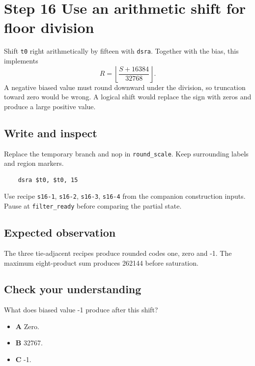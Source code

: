 \section{Step 16 Use an arithmetic shift for floor division}\label{fir-s16}

Shift \texttt{t0} right arithmetically by fifteen with \texttt{dsra}. Together with the bias, this implements
\[R=\left\lfloor\frac{S+16384}{32768}\right\rfloor.\]
A negative biased value must round downward under the division, so truncation toward zero would be wrong. A logical shift would replace the sign with zeros and produce a large positive value.

\subsection{Write and inspect}
Replace the temporary branch and nop in \texttt{round\_scale}. Keep surrounding labels and region markers.

\begin{verbatim}
    dsra $t0, $t0, 15
\end{verbatim}
Use recipe \texttt{s16-1}, \texttt{s16-2}, \texttt{s16-3}, \texttt{s16-4} from the companion construction inputs. Pause at \texttt{filter\_ready} before comparing the partial state.

\subsection{Expected observation}
The three tie-adjacent recipes produce rounded codes one, zero and -1. The maximum eight-product sum produces 262144 before saturation.

\subsection{Check your understanding}
What does biased value -1 produce after this shift?

\begin{itemize}
\item \textbf{A} Zero.
\item \textbf{B} 32767.
\item \textbf{C} -1.
\end{itemize}
